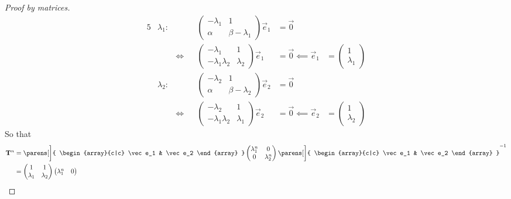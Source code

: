 \begin{proof}[Proof by matrices]
 \begin{alignat*}5
  & \lambda_1 \colon&
  &&
   \begin{pmatrix}
    -\lambda_1 & 1 \\
    \alpha & \beta - \lambda_1
   \end{pmatrix} \vec e_1 &= \vec 0 \\
  && \iff{}&&
   \begin{pmatrix}
    -\lambda_1 & 1 \\
    -\lambda_1 \lambda_2 & \lambda_2
   \end{pmatrix} \vec e_1 &= \vec 0 \impliedby \vec e_1 &{}=
   \begin{pmatrix}
    1 \\
    \lambda_1
   \end{pmatrix} \\
  & \lambda_2 \colon&
  &&
   \begin{pmatrix}
    -\lambda_2 & 1 \\
    \alpha & \beta - \lambda_2
   \end{pmatrix} \vec e_2 &= \vec 0 \\
  && \iff{}&&
   \begin{pmatrix}
    -\lambda_2 & 1 \\
    -\lambda_1 \lambda_2 & \lambda_1
   \end{pmatrix} \vec e_2 &= \vec 0 \impliedby \vec e_2 &{}=
   \begin{pmatrix}
    1 \\
    \lambda_2
   \end{pmatrix}
 \end{alignat*}
 So that
 \begin{align*}
  \mat T^n &=
  \parens[\bigg]{
   \begin{array}{c|c}
    \vec e_1 & \vec e_2
   \end{array}
  }
  \begin{pmatrix}
   \lambda_1^n & 0 \\
   0 & \lambda_2^n
  \end{pmatrix}
  \parens[\bigg]{
   \begin{array}{c|c}
    \vec e_1 & \vec e_2
   \end{array}
  }^{-1} \\
  &=
  \begin{pmatrix}
   1 & 1 \\
   \lambda_1 & \lambda_2
  \end{pmatrix}
  \begin{pmatrix}
   \lambda_1^n & 0 \\

\end{pmatrix}
\end{align*}
\end{proof}
